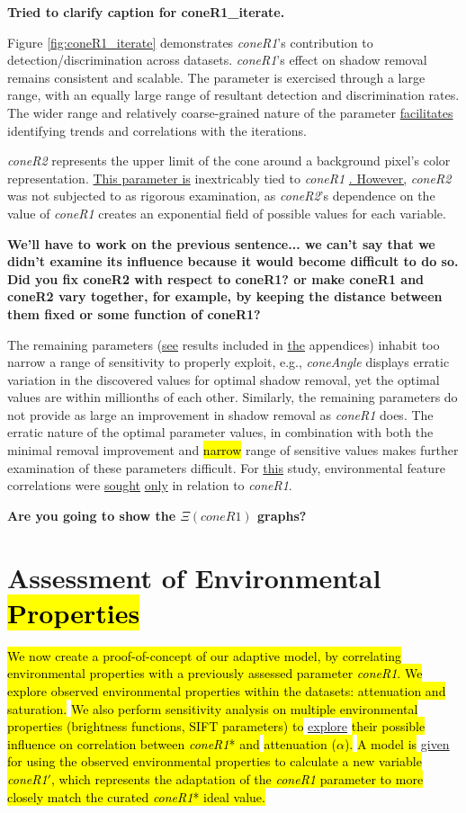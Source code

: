 \documentclass[12pt]{report}
\newcommand{\comment}[1]
           {\par {\bfseries \color{blue} #1 \par}}
\begin{document}
\comment{Tried to clarify caption for coneR1\_iterate.}

Figure \ref{fig:coneR1_iterate} demonstrates \textit{coneR1}'s contribution to detection/discrimination across datasets.
\textit{coneR1}'s effect on shadow removal remains consistent and scalable. The parameter is exercised through a large range, with an equally large range of resultant detection and discrimination rates. The wider range and relatively coarse-grained nature of the parameter \underline{facilitates} identifying trends and correlations with the iterations. 

\textit{coneR2} represents the upper limit of the cone around a background pixel's color representation. \underline{This parameter is} inextricably tied to \textit{coneR1} \underline{. However,} \textit{coneR2} was not subjected to as rigorous examination, as \textit{coneR2}'s dependence on the value of \textit{coneR1} creates an exponential field of possible values for each variable. 
\comment{We'll have to work on the previous sentence... we can't say that we didn't examine its influence because it would become difficult to do so.  Did you fix coneR2 with respect to coneR1?  or make coneR1 and coneR2 vary together, for example, by keeping the distance between them fixed or some function of coneR1?}

The remaining parameters (\underline{see} results included in \underline{the} appendices) inhabit too narrow a range of sensitivity to properly exploit, e.g., \textit{coneAngle} displays erratic variation in the discovered values for optimal shadow removal, yet the optimal values are within millionths of each other. Similarly, the remaining parameters do not provide as large an improvement in shadow removal as \textit{coneR1} does. The erratic nature of the optimal parameter values, in combination with both the minimal removal improvement and \hl{narrow} range of sensitive values makes further examination of these parameters difficult. For \underline{this} study, environmental feature correlations were \underline{sought} \underline{only} in relation to \textit{coneR1}.

\comment{Are you going to show the $\Xi(coneR1)$ graphs?}

\section{Assessment of Environmental \hl{Properties}} \label{section:envassess}

\hl{We now create a proof-of-concept of our adaptive model, by correlating environmental properties with a previously assessed parameter \textit{coneR1}. We explore observed environmental properties within the datasets: attenuation and saturation.} \hl{We also perform sensitivity analysis on multiple environmental properties (brightness functions, SIFT parameters) to} \underline{explore} \hl{their possible influence on correlation between \textit{coneR1}* and} \hl{attenuation ($\alpha$).} \hl{A model is} \underline{given} \hl{for using the observed environmental properties to calculate a new variable \textit{coneR1}$'$, which represents the adaptation of the \textit{coneR1} parameter to more closely match the curated \textit{coneR1}* ideal value.}
\end{document}
